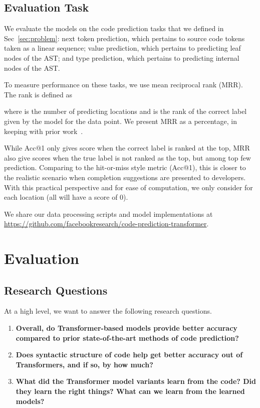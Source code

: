 \documentclass[nonacm, sigconf]{acmart}
\begin{document}
\subsection{Evaluation Task}
We evaluate the models on the code prediction tasks that we defined in Sec~\ref{sec:problem}: next token prediction, which pertains to source code tokens taken as a linear sequence; value prediction, which pertains to predicting leaf nodes of the AST; and type prediction, which pertains to predicting internal nodes of the AST.

To measure performance on these tasks, we use mean reciprocal rank (MRR). 
The rank is defined as 

where  is the number of predicting locations and  is the rank of the correct label given by the model for the  data point. We present MRR as a percentage, in keeping with prior work~\citep{karampatsis2020big-bpe,hellendoorn2017are-deep-best}.

While Acc@1 only gives score when the correct label is ranked at the top,
MRR also give scores when the true label is not ranked as the top, but among top few prediction. 
Comparing to the hit-or-miss style metric (Acc@1), this is closer to the realistic scenario when completion suggestions are presented to developers.
With this practical perspective and for ease of computation, we only consider  for each  location  (all  will have a score of 0).  

We share our data processing scripts and model implementations at \url{https://github.com/facebookresearch/code-prediction-transformer}. 
 
\section{Evaluation}
\label{sec:evaluation}

\subsection{Research Questions}

At a high level, we want to answer the following research questions.

\begin{enumerate}[label=RQ\arabic*]
    \item \textbf{Overall, do Transformer-based models provide better accuracy compared to prior state-of-the-art methods of code prediction?}

    \item \textbf{Does syntactic structure of code help get better accuracy out of Transformers, and if so, by how much?}

    \item  \textbf{What did the Transformer model variants learn from the code? Did they learn the right things? What can we learn from the learned models?}

\end{enumerate}
\end{document}
